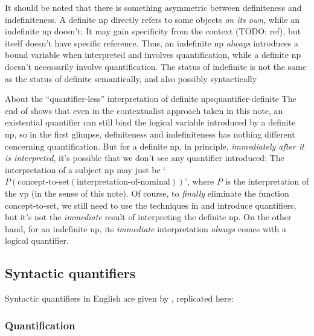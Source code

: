 \documentclass[UTF8, a4paper, oneside, scheme=plain, 12pt]{ctexbook}
\newcommand*{\citepage}[1]{p.~{#1}}
\newcommand{\translate}[1]{`#1'}
\begin{document}
It should be noted that there is something asymmetric between definiteness and indefiniteness.
A definite \acs{np} directly refers to some objects \emph{on its own},
while an indefinite \acs{np} doesn't:
It may gain specificity from the context (TODO: ref), 
but itself doesn't have specific reference.
Thus, an indefinite \acs{np} \emph{always} introduces a bound variable when interpreted 
and involves quantification,
while a definite \acs{np} doesn't necessarily involve quantification.
The status of indefinite is not the same as the status of definite semantically,
and also possibly syntactically \citep{gianollo2021reference,klockmann2020article}

\begin{theorybox}{About the ``quantifier-less'' interpretation of definite \acs{np}s}{quantifier-definite}
    The end of 
    shows that even in the contextualist approach taken in this note,
    an existential quantifier can still bind the logical variable introduced by a definite \acs{np},
    so in the first glimpse, 
    definiteness and indefiniteness has nothing different concerning quantification.
    But for a definite \acs{np},
    in principle, 
    \emph{immediately after it is interpreted},
    it's possible that we don't see any quantifier introduced:
    The interpretation of a subject \acs{np} 
    may just be \translate{$P(\text{concept-to-set}(\text{interpretation-of-nominal}))$},
    where $P$ is the interpretation of the \acs{vp} (in the sense of this note).
    Of course, to \emph{finally} eliminate the function concept-to-set, 
    we still need to use the techniques in 
    and introduce quantifiers,
    but it's not the \emph{immediate} result of interpreting the definite \acs{np}.
    On the other hand, 
    for an indefinite \acs{np},
    its \emph{immediate} interpretation \emph{always} comes with a logical quantifier.
\end{theorybox}

\subsection{Syntactic quantifiers}\label{sec:np.det.quantifier}

Syntactic quantifiers in English are given by \citet[\citepage{361}, {[9]}]{cgel},
replicated here:

\subsubsection{Quantification}
\end{document}
